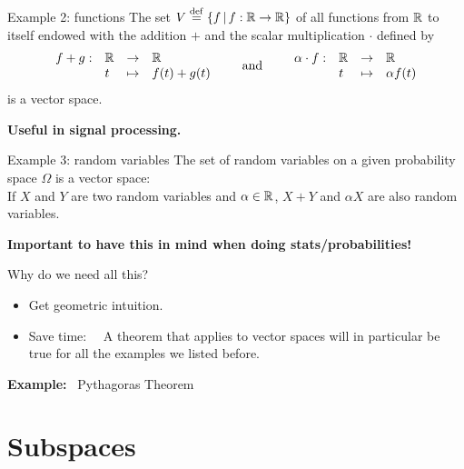 \documentclass{beamer}
\begin{document}
\begin{frame}[t]{Example 2: functions}
	The set \quad $V \overset{\rm def}{=} \{ f \, | \, f: \mathbb{R} \to \mathbb{R} \}$ \quad of all functions from $\mathbb{R}$ to itself endowed with the addition $+$ and the scalar multiplication $\cdot$ defined by
	$$
	\begin{array}{rlll}
		f+g :& \mathbb{R} & \to & \mathbb{R} \\
			 &t & \mapsto & f(t) + g(t)
	\end{array}
	\qquad
	\text{and}
	\qquad
	\begin{array}{rlll}
		\alpha \cdot f :& \mathbb{R} & \to & \mathbb{R} \\
						&t & \mapsto & \alpha f(t)
	\end{array}
	$$
	is a vector space.
	\vspace{3cm}
	\begin{center}
		\textbf{Useful in signal processing.}
	\end{center}
\end{frame}

\begin{frame}{Example 3: random variables}
	The set of random variables on a given probability space $\Omega$ is a vector space: 
	\\
	If $X$ and $Y$ are two random variables and $\alpha \in \mathbb{R}$, $X+Y$ and $\alpha X$ are also random variables.

	\vspace{0.8cm}
	\begin{center}
		\textbf{Important to have this in mind when doing stats/probabilities!}
	\end{center}
\end{frame}

\begin{frame}[t]{Why do we need all this?}
			\vspace{-0.3cm}
	\begin{itemize}
		\item Get geometric intuition. 
			\vspace{0.1cm}
		\item Save time: \ \ 
			A theorem that applies to vector spaces will in particular be true for all the examples we listed before.
	\end{itemize}
	\vspace{0.2cm}
	\textbf{Example:} \ Pythagoras Theorem
\end{frame}

\section{Subspaces}
\end{document}
